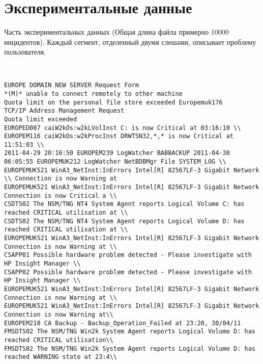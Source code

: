 \chapter{Экспериментальные данные}\label{AppendixE}
Часть экспериментальных данных (Общая длина файла примерно 10000 инцидентов). Каждый сегмент, отделенный двумя слешами, описывает проблему пользователя.
\begin{lstlisting}
	

EUROPE DOMAIN NEW SERVER Request Form
*(M)* unable to connect remotely to other machine 
Quota limit on the personal file store exceeded Europemuk176 
TCP/IP Address Management Request 
Quota limit exceeded 
EUROPED007 caiW2kOs:w2kLVolInst C: is now Critical at 03:16:10 \\
EUROPEM116 caiW2kOs:w2kProcInst DRWTSN32,*,* is now Critical at 11:51:03 \\
2011-04-29 20:16:50 EUROPEM239 LogWatcher BABBACKUP 2011-04-30 06:05:55 EUROPEMUK212 LogWatcher NetBDBMgr File SYSTEM_LOG \\
EUROPEMUK521 WinA3_NetInst:InErrors Intel[R] 82567LF-3 Gigabit Network \\ Connection is now Warning at 
EUROPEMUK521 WinA3_NetInst:InErrors Intel[R] 82567LF-3 Gigabit Network Connection is now Critical a \\
CSDTS02 The NSM/TNG NT4 System Agent reports Logical Volume C: has reached CRITICAL utilisation at \\
CSDTS02 The NSM/TNG NT4 System Agent reports Logical Volume D: has reached CRITICAL utilisation at \\
EUROPEMUK521 WinA3_NetInst:InErrors Intel[R] 82567LF-3 Gigabit Network Connection is now Warning at \\
CSAPP01 Possible hardware problem detected - Please investigate with HP Insight Manager \\
CSAPP02 Possible hardware problem detected - Please investigate with HP Insight Manager \\
EUROPEMUK521 WinA3_NetInst:InErrors Intel[R] 82567LF-3 Gigabit Network Connection is now Warning at \\
EUROPEMUK521 WinA3_NetInst:InErrors Intel[R] 82567LF-3 Gigabit Network Connection is now Warning at\\
EUROPEM218 CA Backup - Backup_Operation_Failed at 23:20, 30/04/11
FMSDTS02 The NSM/TNG Win2k System Agent reports Logical Volume D: has reached CRITICAL utilisation\\
FMSDTS02 The NSM/TNG Win2k System Agent reports Logical Volume D: has reached WARNING state at 23:4\\

\end{lstlisting}
